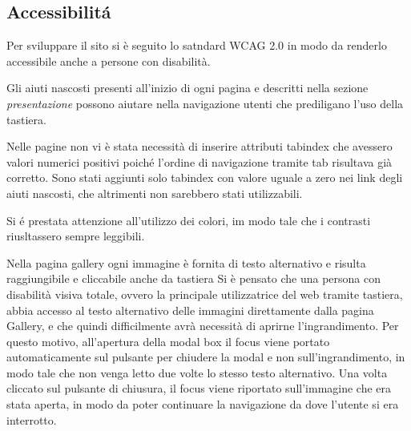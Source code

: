 	\subsection{Accessibilit\'a}
		Per sviluppare il sito si è seguito lo satndard WCAG 2.0 in modo da renderlo accessibile anche a persone con disabilità.

		Gli aiuti nascosti presenti all'inizio di ogni pagina e descritti nella sezione \emph{presentazione} possono aiutare nella navigazione utenti che prediligano l'uso della tastiera.

		Nelle pagine non vi è stata necessità di inserire attributi tabindex che avessero valori numerici positivi poiché l'ordine di navigazione tramite tab risultava già corretto.
		Sono stati aggiunti solo tabindex con valore uguale a zero nei link degli aiuti nascosti, che altrimenti non sarebbero stati utilizzabili.

		Si \'e prestata attenzione all'utilizzo dei colori, im modo tale che i contrasti riusltassero sempre leggibili.

		Nella pagina gallery ogni immagine è fornita di testo alternativo e risulta raggiungibile e cliccabile anche da tastiera
		Si è pensato che una persona con disabilità visiva totale, ovvero la principale utilizzatrice del web tramite tastiera, abbia accesso al testo alternativo delle immagini direttamente dalla pagina Gallery, e che quindi difficilmente avrà necessità di aprirne l'ingrandimento.
		Per questo motivo, all'apertura della modal box il focus viene portato automaticamente sul pulsante per chiudere la modal e non sull'ingrandimento, in modo tale che non venga letto due volte lo stesso testo alternativo.
		Una volta cliccato sul pulsante di chiusura, il focus viene riportato sull'immagine che era stata aperta, in modo da poter continuare la navigazione da dove l'utente si era interrotto. 
